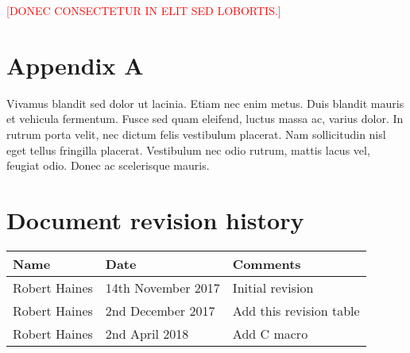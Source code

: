 \documentclass[11pt]{article}
\def\cpp{{C\nolinebreak[4]\hspace{-.05em}\raisebox{.4ex}{\tiny\bf ++}}\xspace}
\newcommand{\notetoself}[1]{\textcolor{red}{[\uppercase{#1}]}}
\begin{document}
\notetoself{Donec consectetur in elit sed lobortis.}

\begin{appendices}

\section{Appendix A}

Vivamus blandit sed dolor ut lacinia. Etiam nec enim metus. Duis blandit mauris et vehicula fermentum. Fusce sed quam eleifend, luctus massa ac, varius dolor. In rutrum porta velit, nec dictum felis vestibulum placerat. Nam sollicitudin nisl eget tellus fringilla placerat. Vestibulum nec odio rutrum, mattis lacus vel, feugiat odio. Donec ac scelerisque mauris.

\section{Document revision history}

\begin{tabularx}{\textwidth}{ |l|l|X| }
  \hline
  \textbf{Name} & \textbf{Date} & \textbf{Comments} \\
  \hline \hline
  Robert Haines & 14th November 2017 & Initial revision \\
  \hline
  Robert Haines & 2nd December 2017 & Add this revision table \\
  \hline
  Robert Haines & 2nd April 2018 & Add \cpp macro \\
  \hline
\end{tabularx}

\end{appendices}
\end{document}
